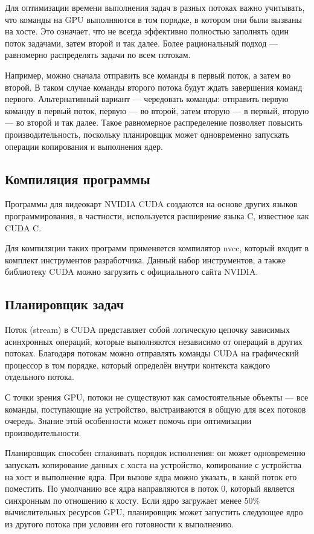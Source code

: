 \documentclass{article}[14pt]
\begin{document}
Для оптимизации времени выполнения задач в разных потоках важно учитывать, что команды на GPU выполняются в том порядке, в котором они были 
вызваны на хосте. Это означает, что не всегда эффективно полностью заполнять один поток задачами, затем второй и так далее. Более рациональный 
подход — равномерно распределять задачи по всем потокам.

Например, можно сначала отправить все команды в первый поток, а затем во второй. В таком случае команды второго потока будут ждать завершения 
команд первого. Альтернативный вариант — чередовать команды: отправить первую команду в первый поток, первую — во второй, затем вторую — в 
первый, вторую — во второй и так далее. Такое равномерное распределение позволяет повысить производительность, поскольку планировщик может 
одновременно запускать операции копирования и выполнения ядер.

\subsection{Компиляция программы}

Программы для видеокарт NVIDIA CUDA создаются на основе других языков программирования, в частности, используется расширение языка C, 
известное как CUDA C.

Для компиляции таких программ применяется компилятор nvcc, который входит в комплект инструментов разработчика. Данный набор инструментов, 
а также библиотеку CUDA можно загрузить с официального сайта NVIDIA.

\subsection{Планировщик задач}

Поток (stream) в CUDA представляет собой логическую цепочку зависимых асинхронных операций, которые выполняются независимо от операций в 
других потоках. Благодаря потокам можно отправлять команды CUDA на графический процессор в том порядке, который определён внутри контекста 
каждого отдельного потока.

С точки зрения GPU, потоки не существуют как самостоятельные объекты — все команды, поступающие на устройство, выстраиваются в общую для всех 
потоков очередь. Знание этой особенности может помочь при оптимизации производительности.

Планировщик способен сглаживать порядок исполнения: он может одновременно запускать копирование данных с хоста на устройство, копирование с 
устройства на хост и выполнение ядра. При вызове ядра можно указать, в какой поток его поместить. По умолчанию все ядра направляются в поток 0, 
который является синхронным по отношению к хосту. Если ядро загружает менее 50\% вычислительных ресурсов GPU, планировщик может запустить 
следующее ядро из другого потока при условии его готовности к выполнению.
\end{document}
